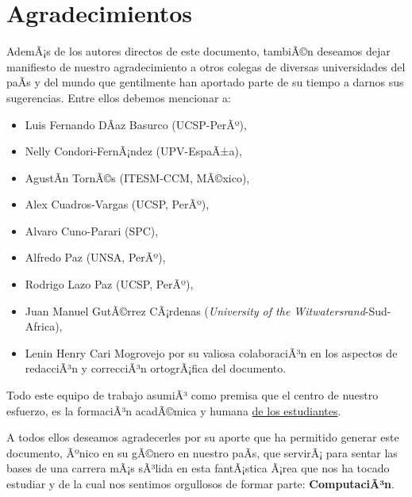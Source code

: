 \chapter*{Agradecimientos}\label{chap:cs-ack}
%

AdemÃ¡s de los autores directos de este documento, tambiÃ©n deseamos dejar manifiesto de nuestro 
agradecimiento a otros colegas de diversas universidades del paÃ­s y del mundo que gentilmente 
han aportado parte de su tiempo a darnos sus sugerencias. Entre ellos debemos mencionar a:

\begin{itemize}
\item Luis Fernando DÃ­az Basurco (UCSP-PerÃº), 
\item Nelly Condori-FernÃ¡ndez (UPV-EspaÃ±a), 
\item AgustÃ­n TornÃ©s (ITESM-CCM, MÃ©xico), 
\item Alex Cuadros-Vargas (UCSP, PerÃº),
\item Alvaro Cuno-Parari (SPC),
\item Alfredo Paz (UNSA, PerÃº), 
\item Rodrigo Lazo Paz (UCSP, PerÃº),
\item Juan Manuel GutÃ©rrez CÃ¡rdenas (\textit{University of the Witwatersrand}-Sud-Africa),
\item Lenin Henry Cari Mogrovejo por su valiosa colaboraciÃ³n en los aspectos de redacciÃ³n y correcciÃ³n ortogrÃ¡fica del documento.
\end{itemize}

Todo este equipo de trabajo asumiÃ³ como premisa que el centro de nuestro esfuerzo, 
es la formaciÃ³n acadÃ©mica y humana \underline{de los estudiantes}.

A todos ellos deseamos agradecerles por su aporte que ha permitido generar 
este documento, Ãºnico en su gÃ©nero en nuestro paÃ­s, que servirÃ¡ para sentar las 
bases de una carrera mÃ¡s sÃ³lida en esta fantÃ¡stica Ã¡rea que nos ha tocado estudiar y 
de la cual nos sentimos orgullosos de formar parte: \textbf{ComputaciÃ³n}.
